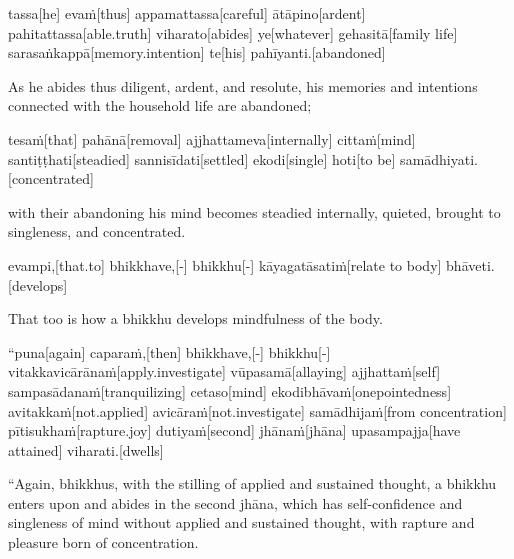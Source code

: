 \begin{samepage}
\begingl[glneveryline={\PaliGlossA,\PaliGlossB}]
tassa[he] evaṁ[thus] appamattassa[careful] ātāpino[ardent] pahitattassa[able.truth] viharato[abides] ye[whatever] gehasitā[family life] sarasaṅkappā[memory.intention] te[his] pahīyanti.[abandoned]
\endgl
\nopagebreak
\linespread{0.5}
\begin{spacin}{0.2}
{\PaliGlossFT As he abides thus diligent, ardent, and resolute, his memories and intentions connected with the household life are abandoned;}
\end{spacin}
\vskip 12pt
\end{samepage}
\begin{samepage}
\begingl[glneveryline={\PaliGlossA,\PaliGlossB}]
tesaṁ[that] pahānā[removal] ajjhattameva[internally] cittaṁ[mind] santiṭṭhati[steadied] sannisīdati[settled] ekodi[single] hoti[to be] samādhiyati.[concentrated]
\endgl
\nopagebreak
\linespread{0.5}
\begin{spacin}{0.2}
{\PaliGlossFT with their abandoning his mind becomes steadied internally, quieted, brought to singleness, and concentrated.}
\end{spacin}
\vskip 12pt
\end{samepage}
\begin{samepage}
\begingl[glneveryline={\PaliGlossA,\PaliGlossB}]
evampi,[that.to] bhikkhave,[-] bhikkhu[-] kāyagatāsatiṁ[relate to body] bhāveti.[develops]
\endgl
\nopagebreak
\linespread{0.5}
\begin{spacin}{0.2}
{\PaliGlossFT That too is how a bhikkhu develops mindfulness of the body.}
\end{spacin}
\vskip 12pt
\end{samepage}
\vskip 0.2in
\begin{samepage}
\begingl[glneveryline={\PaliGlossA,\PaliGlossB}]
“puna[again] caparaṁ,[then] bhikkhave,[-] bhikkhu[-] vitakkavicārānaṁ[apply.investigate] vūpasamā[allaying] ajjhattaṁ[self] sampasādanaṁ[tranquilizing] cetaso[mind] ekodibhāvaṁ[onepointedness] avitakkaṁ[not.applied] avicāraṁ[not.investigate] samādhijaṁ[from concentration] pītisukhaṁ[rapture.joy] dutiyaṁ[second] jhānaṁ[jhāna] upasampajja[have attained] viharati.[dwells]
\endgl
\nopagebreak
\linespread{0.5}
\begin{spacin}{0.2}
{\PaliGlossFT “Again, bhikkhus, with the stilling of applied and sustained thought, a bhikkhu enters upon and abides in the second jhāna, which has self-confidence and singleness of mind without applied and sustained thought, with rapture and pleasure born of concentration.}
\end{spacin}
\vskip 12pt
\end{samepage}
